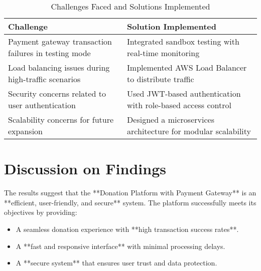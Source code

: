 \begin{table}[h]
    \centering
    \begin{tabular}{|p{6cm}|p{6cm}|}
        \hline
        \textbf{Challenge} & \textbf{Solution Implemented} \\
        \hline
        Payment gateway transaction failures in testing mode & Integrated sandbox testing with real-time monitoring \\
        \hline
        Load balancing issues during high-traffic scenarios & Implemented AWS Load Balancer to distribute traffic \\
        \hline
        Security concerns related to user authentication & Used JWT-based authentication with role-based access control \\
        \hline
        Scalability concerns for future expansion & Designed a microservices architecture for modular scalability \\
        \hline
    \end{tabular}
    \caption{Challenges Faced and Solutions Implemented}
    \label{table:challenges_solutions}
\end{table}

\section{Discussion on Findings}
The results suggest that the **Donation Platform with Payment Gateway** is an **efficient, user-friendly, and secure** system. The platform successfully meets its objectives by providing:
\begin{itemize}
    \item A seamless donation experience with **high transaction success rates**.
    \item A **fast and responsive interface** with minimal processing delays.
    \item A **secure system** that ensures user trust and data protection.
\end{itemize}